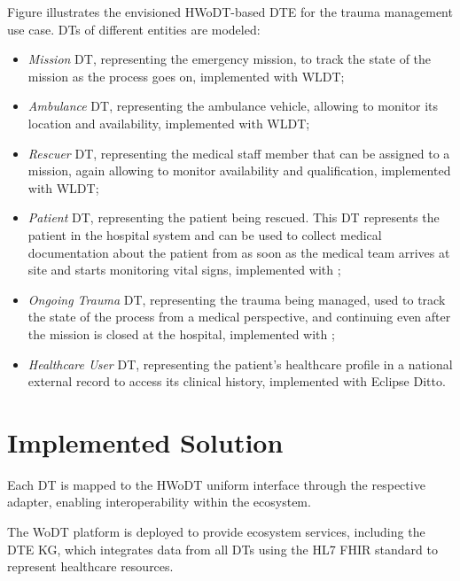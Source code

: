 Figure  illustrates the envisioned \ac{HWoDT}-based \ac{DTE} for the trauma management use case.
%
\acp{DT} of different entities are modeled: 
\begin{itemize}
    \item \emph{Mission} \ac{DT}, representing the emergency mission, to track the state of the mission as the process goes on, implemented with \ac{WLDT};
    \item \emph{Ambulance} \ac{DT}, representing the ambulance vehicle, allowing to monitor its location and availability, implemented with \ac{WLDT};
    \item \emph{Rescuer} \ac{DT}, representing the medical staff member that can be assigned to a mission, again allowing to monitor availability and qualification, implemented with \ac{WLDT};
    \item \emph{Patient} \ac{DT}, representing the patient being rescued. This \ac{DT} represents the patient in the hospital system and can be used to collect medical documentation about the patient from as soon as the medical team arrives at site and starts monitoring vital signs, implemented with \azureTwin{};
    \item \emph{Ongoing Trauma} \ac{DT}, representing the trauma being managed, used to track the state of the process from a medical perspective, and continuing even after the mission is closed at the hospital, implemented with \azureTwin{};
    \item \emph{Healthcare User} \ac{DT}, representing the patient's healthcare profile in a national external record to access its clinical history, implemented with Eclipse Ditto.
\end{itemize}


\section{Implemented Solution}

Each \ac{DT} is mapped to the \ac{HWoDT} uniform interface through the respective adapter, enabling interoperability within the ecosystem.

The \ac{WoDT} platform is deployed to provide ecosystem services, including the \ac{DTE} \ac{KG}, which integrates data from all \acp{DT} using the HL7 FHIR standard to represent healthcare resources.

